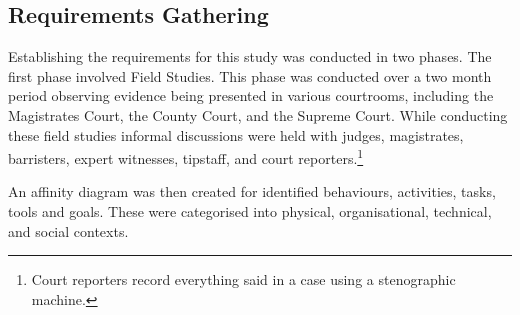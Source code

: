 \subsection{Requirements Gathering}
Establishing the requirements for this study was conducted in two phases. The first phase involved Field Studies. This phase was conducted over a two month period observing evidence being presented in various courtrooms, including the Magistrates Court, the County Court, and the Supreme Court. While conducting these field studies informal discussions were held with judges, magistrates, barristers, expert witnesses, tipstaff, and court reporters.\footnote{Court reporters record everything said in a case using a stenographic machine.  }

An affinity diagram was then created for identified behaviours, activities, tasks, tools and goals. These were categorised into physical, organisational, technical, and social contexts.


